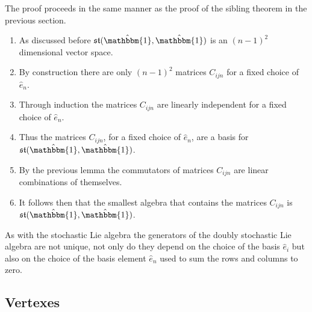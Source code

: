 \begin{IEEEproof}
	The proof proceeds in the same manner as the proof of the sibling theorem in
	the previous section.
	\begin{enumerate}
		\item As discussed before $\mathfrak{st}(\hat{\mathbbm{1}}, \hat{\mathbbm{1}})$
		is an $\left(n-1\right)^2$ dimensional vector space.
		\item By construction there are only $\left(n-1\right)^2$ matrices $C_{ijn}$
		for a fixed choice of $\hat{e}_n$.
		\item Through induction the matrices $C_{ijn}$ are linearly independent for
		a fixed choice of $\hat{e}_n$.
		\item Thus the matrices $C_{ijn}$, for a fixed choice of $\hat{e}_n$, are a 
		basis for $\mathfrak{st}(\hat{\mathbbm{1}}, \hat{\mathbbm{1}})$.
		\item By the previous lemma the commutators of matrices $C_{ijn}$ are linear
		combinations of themselves.
		\item It follows then that the smallest algebra that contains the matrices $C_{ijn}$
		is $\mathfrak{st}(\hat{\mathbbm{1}}, \hat{\mathbbm{1}})$.\hfill\IEEEQEDhere
	\end{enumerate}
\end{IEEEproof}

As with the stochastic Lie algebra the generators of the doubly stochastic Lie 
algebra are not unique, not only do they depend on the choice of the basis $\hat{e}_i$ 
but also on the choice of the basis element $\hat{e}_n$ used to sum the rows and 
columns to zero.

\subsection{Vertexes}


